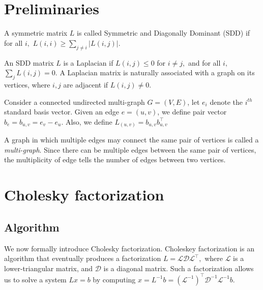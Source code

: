 \documentclass[11pt]{article}
\begin{document}
\section{Preliminaries}
\begin{definition}
  A symmetric matrix $L$ is called Symmetric and Diagonally Dominant
  (SDD) if for all $i,$ $L(i,i) \ge \sum_{j \neq i} |L(i,j)|$.

\end{definition}

\begin{definition}
  An SDD matrix $L$ is a Laplacian if $L(i,j) \le 0$ for $i \neq j,$ and 
  for all $i,$ $\sum_{j} L(i,j) = 0.$ A Laplacian matrix is
  naturally associated with a graph on its vertices, where $i,j$ are
  adjacent if $L(i,j) \neq 0.$
\end{definition}

\begin{definition}
Consider a connected undirected multi-graph $G = (V,E)$, let $e_i$ denote the $i^{th}$ standard basis vector. Given an edge $e = (u,v)$, we define pair vector $b_e = b_{u,v} = e_v - e_u$. Also, we define $L_{(u,v)} = b_{u,v} b_{u,v}^\top$
\end{definition}


\begin{definition}
  A graph in which multiple edges may connect the same pair of vertices is called a \emph{multi-graph}. Since there can be multiple edges between the same pair of vertices, the multiplicity of edge tells the number of edges between two vertices.

\end{definition}


\section{Cholesky factorization}

\subsection{Algorithm}
We now formally introduce Cholesky factorization. Choleskey factorization is an algorithm that eventually produces a factorization 
$L = \mathcal{L} \mathcal{D} \mathcal{L}^{\top},$ where $\mathcal{L}$
is a lower-triangular matrix, and $\mathcal{D}$ is a diagonal
matrix. Such a factorization allows us to solve a system $Lx = b$ by
computing $x = L^{-1} b = (\mathcal{L}^{-1})^{\top} \mathcal{D}^{-1}
\mathcal{L}^{-1} b$. 
\end{document}
